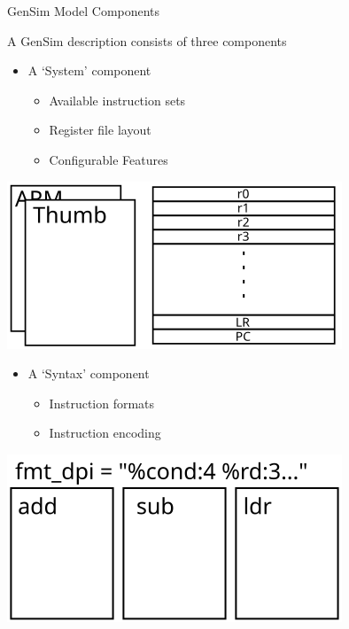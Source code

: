 \begin{frame}{GenSim Model Components}

A GenSim description consists of three components
\pause

\begin{minipage}[h]{0.6\textwidth}
\begin{itemize}
\item A `System' component
\begin{itemize}
\item Available instruction sets
\item Register file layout
\item Configurable Features
\end{itemize}
\end{itemize}
\end{minipage}%
\begin{minipage}[h]{0.35\textwidth}
\centering
\includegraphics[width=\textwidth]{figures/component-system}
\end{minipage}

\smallskip
\pause

\begin{minipage}[h]{0.6\textwidth}
\begin{itemize}
\item A `Syntax' component
\begin{itemize}
\item Instruction formats
\item Instruction encoding
\end{itemize}
\end{itemize}
\end{minipage}%
\begin{minipage}[h]{0.35\textwidth}
\centering
\includegraphics[width=\textwidth]{figures/component-syntax}
\end{minipage}


\end{frame}
